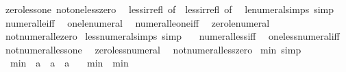 \begin{isabellebody}
\ \ zero{\isacharunderscore}{\kern0pt}less{\isacharunderscore}{\kern0pt}one\ not{\isacharunderscore}{\kern0pt}one{\isacharunderscore}{\kern0pt}less{\isacharunderscore}{\kern0pt}zero\isanewline
\ \ less{\isacharunderscore}{\kern0pt}irrefl\ {\isacharbrackleft}{\kern0pt}of\ {}{\isacharbrackright}{\kern0pt}\ less{\isacharunderscore}{\kern0pt}irrefl\ {\isacharbrackleft}{\kern0pt}of\ {}{\isacharbrackright}{\kern0pt}\isanewline
\isanewline
{}\isamarkupfalse%
\ le{\isacharunderscore}{\kern0pt}numeral{\isacharunderscore}{\kern0pt}simps\ {\isacharbrackleft}{\kern0pt}simp{\isacharbrackright}{\kern0pt}\ {\isacharequal}{\kern0pt}\isanewline
\ \ numeral{\isacharunderscore}{\kern0pt}le{\isacharunderscore}{\kern0pt}iff\isanewline
\ \ one{\isacharunderscore}{\kern0pt}le{\isacharunderscore}{\kern0pt}numeral\isanewline
\ \ numeral{\isacharunderscore}{\kern0pt}le{\isacharunderscore}{\kern0pt}one{\isacharunderscore}{\kern0pt}iff\isanewline
\ \ zero{\isacharunderscore}{\kern0pt}le{\isacharunderscore}{\kern0pt}numeral\isanewline
\ \ not{\isacharunderscore}{\kern0pt}numeral{\isacharunderscore}{\kern0pt}le{\isacharunderscore}{\kern0pt}zero\isanewline
\isanewline
{}\isamarkupfalse%
\ less{\isacharunderscore}{\kern0pt}numeral{\isacharunderscore}{\kern0pt}simps\ {\isacharbrackleft}{\kern0pt}simp{\isacharbrackright}{\kern0pt}\ {\isacharequal}{\kern0pt}\isanewline
\ \ numeral{\isacharunderscore}{\kern0pt}less{\isacharunderscore}{\kern0pt}iff\isanewline
\ \ one{\isacharunderscore}{\kern0pt}less{\isacharunderscore}{\kern0pt}numeral{\isacharunderscore}{\kern0pt}iff\isanewline
\ \ not{\isacharunderscore}{\kern0pt}numeral{\isacharunderscore}{\kern0pt}less{\isacharunderscore}{\kern0pt}one\isanewline
\ \ zero{\isacharunderscore}{\kern0pt}less{\isacharunderscore}{\kern0pt}numeral\isanewline
\ \ not{\isacharunderscore}{\kern0pt}numeral{\isacharunderscore}{\kern0pt}less{\isacharunderscore}{\kern0pt}zero\isanewline
\isanewline
{}\isamarkupfalse%
\ min{\isacharunderscore}{\kern0pt}{}{\isacharunderscore}{\kern0pt}{}\ {\isacharbrackleft}{\kern0pt}simp{\isacharbrackright}{\kern0pt}{\isacharcolon}{\kern0pt}\isanewline
\ \ \ min{\isacharprime}{\kern0pt}\ {\isacharcolon}{\kern0pt}{\isacharcolon}{\kern0pt}\ {\isachardoublequoteopen}{\isacharprime}{\kern0pt}a\ {\isasymRightarrow}\ {\isacharprime}{\kern0pt}a\ {\isasymRightarrow}\ {\isacharprime}{\kern0pt}a{\isachardoublequoteclose}\isanewline
\ \ \ {\isachardoublequoteopen}min{\isacharprime}{\kern0pt}\ {\isasymequiv}\ min{\isachardoublequoteclose}\isanewline

\end{isabellebody}
